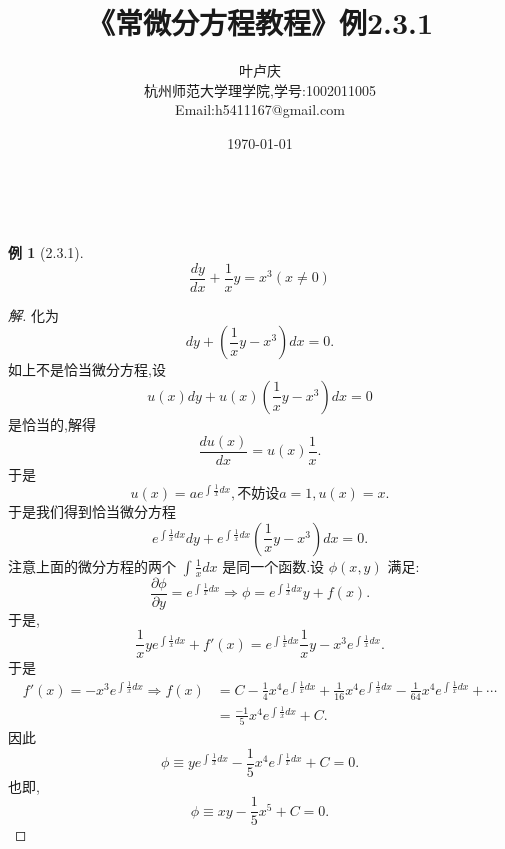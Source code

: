 \documentclass[a4paper, 12pt]{article} %
\title{\textbf{《常微分方程教程》例2.3.1}}
\author{\small{叶卢庆}\\{\small{杭州师范大学理学院,学号:1002011005}}\\{\small{Email:h5411167@gmail.com}}}
\date{\today}
\makeatletter
\newtheorem*{pdtheorem}{例}
\newenvironment{example}
{\bigskip\begin{mdframed}[backgroundcolor=gray!40,rightline=false,leftline=false,topline=false,bottomline=false]\begin{pdtheorem}}
    {\end{pdtheorem}\end{mdframed}\bigskip}
\renewcommand{\maketitle}{ %
  \renewcommand\refname{参考文献}
  \newcommand{\D}{\displaystyle}\newcommand{\ri}{\Rightarrow}
  \newcommand{\ds}{\displaystyle} \renewcommand{\ni}{\noindent}
  \newcommand{\pa}{\partial} \newcommand{\Om}{\Omega}
  \newcommand{\om}{\omega} \newcommand{\sik}{\sum_{i=1}^k}
  \newcommand{\vov}{\Vert\omega\Vert} \newcommand{\Umy}{U_{\mu_i,y^i}}
  \newcommand{\lamns}{\lambda_n^{^{\scriptstyle\sigma}}}
  \newcommand{\chiomn}{\chi_{_{\Omega_n}}}
  \newcommand{\ullim}{\underline{\lim}} \newcommand{\bsy}{\boldsymbol}
  \newcommand{\mvb}{\mathversion{bold}} \newcommand{\la}{\lambda}
  \newcommand{\La}{\Lambda} \newcommand{\va}{\varepsilon}
  \newcommand{\be}{\beta} \newcommand{\al}{\alpha}
  \newcommand{\dis}{\displaystyle} \newcommand{\R}{{\mathbb R}}
  \newcommand{\N}{{\mathbb N}} \newcommand{\cF}{{\mathcal F}}
  \newcommand{\gB}{{\mathfrak B}} \newcommand{\eps}{\epsilon}
  \begin{flushright} %
    {\LARGE\@title} %
    
    \vspace{50pt} %
    
    {\large\@author} %
    \\\@date %
    
    \vspace{40pt} %
  \end{flushright}
}
\makeatother
\begin{document}
\maketitle
\begin{example}[2.3.1]
$$
\frac{dy}{dx}+\frac{1}{x}y=x^3(x\neq 0)
$$  
\end{example}
\begin{proof}[解]
化为
$$
dy+(\frac{1}{x}y-x^{3})dx=0.
$$
如上不是恰当微分方程,设
$$
u(x)dy+u(x)(\frac{1}{x}y-x^3)dx=0
$$
是恰当的,解得
$$
\frac{du(x)}{dx}=u(x)\frac{1}{x}.
$$
于是
$$
u(x)=ae^{\int \frac{1}{x}dx},\mbox{不妨设}a=1,u(x)=x.
$$
于是我们得到恰当微分方程
$$
e^{\int \frac{1}{x}dx}dy+e^{\int \frac{1}{x}dx}(\frac{1}{x}y-x^3)dx=0.
$$
注意上面的微分方程的两个 $\int \frac{1}{x}dx$ 是同一个函数.设 $\phi(x,y)$ 满足:
\begin{equation}
  \label{eq:1}
    \frac{\pa\phi}{\pa y}=e^{\int \frac{1}{x}dx}\ri \phi=e^{\int \frac{1}{x}dx}y+f(x).
\end{equation}
于是,
\begin{equation}
  \label{eq:2}
  \frac{1}{x}ye^{\int \frac{1}{x}dx}+f'(x)=e^{\int
    \frac{1}{x}dx}\frac{1}{x}y-x^3e^{\int \frac{1}{x}dx}.
\end{equation}
于是
\begin{align*}
f'(x)=-x^3e^{\int \frac{1}{x}dx}\ri f(x)&=C-\frac{1}{4}x^4e^{\int
  \frac{1}{x}dx}+\frac{1}{16}x^4e^{\int
  \frac{1}{x}dx}-\frac{1}{64}x^4e^{\int
  \frac{1}{x}dx}+\cdots\\&=\frac{-1}{5}x^4e^{\int \frac{1}{x}dx}+C.
\end{align*}
因此
$$
\phi\equiv ye^{\int \frac{1}{x}dx}-\frac{1}{5}x^4e^{\int \frac{1}{x}dx}+C=0.
$$
也即,
$$
\phi\equiv xy-\frac{1}{5}x^5+C=0.
$$
\end{proof}





\end{document}
